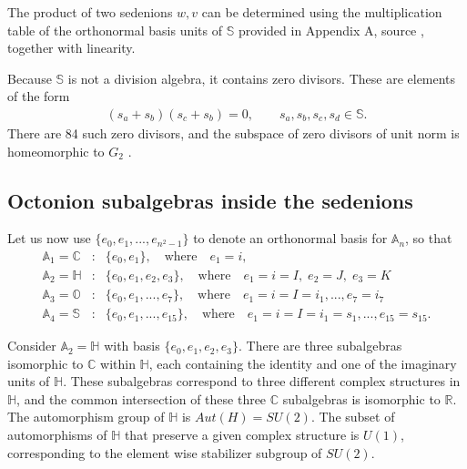 \documentclass{article}
\newcommand{\bb}[1]{\mathbb{#1}}
\begin{document}
The product of two sedenions $w,v$ can be determined using the multiplication table of the orthonormal basis units of $\bb{S}$ provided in Appendix A, source \cite{lohmus1994nonassociative,cawagas2004structure}, together with linearity.

Because $\bb{S}$ is not a division algebra, it contains zero divisors. These are elements of the form
\begin{eqnarray}
(s_a+s_b)(s_c+s_b)=0,\qquad s_a,s_b,s_c,s_d\in\mathbb{S}.
\end{eqnarray}
There are 84 such zero divisors, and the subspace of zero divisors of unit norm is homeomorphic to $G_2$ \cite{moreno1997zero}. 

\subsection{Octonion subalgebras inside the sedenions}

Let us now use $\{e_0,e_1,...,e_{n^2-1}\}$ to denote an orthonormal basis for $\bb{A}_n$, so that
\begin{eqnarray}
    \bb{A}_1=\bb{C}&:& \{e_0,e_1\},\quad\textrm{where}\quad e_1=i,\\
    \bb{A}_2=\bb{H}&:& \{e_0,e_1,e_2,e_3\},\quad\textrm{where}\quad e_1=i=I,\; e_2=J,\; e_3=K\\
    \bb{A}_3=\bb{O}&:& \{e_0,e_1,...,e_7\},\quad\textrm{where}\quad e_1=i=I=i_1,...,e_7=i_7\\
    \bb{A}_4=\bb{S}&:& \{e_0,e_1,...,e_{15}\},\quad\textrm{where}\quad e_1=i=I=i_1=s_1,...,e_{15}=s_{15}.
\end{eqnarray}


Consider $\bb{A}_2=\bb{H}$ with basis $\{e_0,e_1,e_2,e_3\}$. There are three subalgebras isomorphic to $\bb{C}$ within $\bb{H}$, each containing the identity and one of the imaginary units of $\bb{H}$. These subalgebras correspond to three different complex structures in $\bb{H}$, and the common intersection of these three $\bb{C}$ subalgebras is isomorphic to $\bb{R}$. The automorphism group of $\bb{H}$ is $Aut(H)=SU(2)$. The subset of automorphisms of $\bb{H}$ that preserve a given complex structure is $U(1)$, corresponding to the element wise stabilizer subgroup of $SU(2)$.
\end{document}
